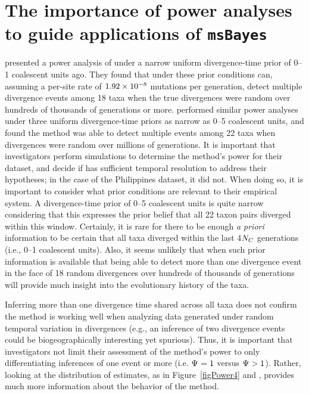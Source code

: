\section{The importance of power analyses to guide applications of \texttt{msBayes}}
\citet{Hickerson2013} presented a power analysis of \msb under a narrow uniform
divergence-time prior of 0--1 coalescent units ago.
They found that under these prior conditions \msb can, assuming a
per-site rate of $1.92\times 10^{-8}$ mutations per generation, detect multiple
divergence events among 18 taxa when the true divergences were random over
hundreds of thousands of generations or more.
\citet{Oaks2012} performed similar power analyses under three uniform
divergence-time priors as narrow as 0--5 coalescent units, and found the method
was able to detect multiple events among 22 taxa when divergences were random
over millions of generations.
It is important that investigators perform simulations to determine the
method's power for their dataset, and decide if \msb has sufficient temporal
resolution to address their hypotheses; in the case of the Philippines dataset,
it did not.
When doing so, it is important to consider what prior conditions are
relevant to their empirical system.
A divergence-time prior of 0--5 coalescent units is quite narrow considering
that this expresses the prior belief that all 22 taxon pairs diverged within
this window.
Certainly, it is  rare for there to be enough \emph{a priori} information to
be certain that all taxa diverged within the last 4$N_C$ generations
(i.e., 0--1 coalescent units).
Also, it seems unlikely that when such prior information is available that
being able to detect more than one divergence event in the face of 18 random
divergences over hundreds of thousands of generations will provide much insight
into the evolutionary history of the taxa.

Inferring more than one divergence time shared across all taxa does not confirm
the method is working well when analyzing data generated under random temporal
variation in divergences (e.g., an inference of two divergence events could be
biogeographically interesting yet spurious).
Thus, it is important that investigators not limit their assessment of the
method's power to only differentiating inferences of one event or more (i.e.
$\Psi_{} = 1$ versus $\Psi_{} > 1$).
Rather, looking at the distribution of estimates, as in Figure~\ref{figPower4}
and \citet{Oaks2012}, provides much more information about the behavior of the
method.



